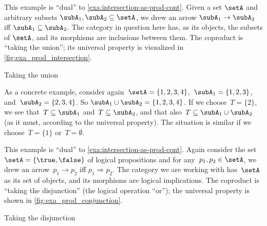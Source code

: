\begin{example}
    \label{exa:union-as-coprod-cont}
    This example is ``dual'' to \cref{exa:intersection-as-prod-cont}.
    Given a set $\setA$ and arbitrary subsets $\subA_1, \subA_2 \subseteq \setA$, we drew an arrow $\subA_1 \to \subA_2$ iff $\subA_1 \subseteq \subA_2$. The category in question here has, as its objects, the subsets of $\setA$, and its morphisms are inclusions between them.
    The coproduct is ``taking the union''; its universal property is visualized in \cref{fig:exa_prod_intersection}.
    \begin{marginfigure}
        \centering
        \caption{Taking the union}
        \label{fig:exa_coprod_union_cont}
    \end{marginfigure}
    As a concrete example, consider again~$\setA = \{ 1, 2, 3, 4 \}$,~$\subA_1 = \{ 1, 2, 3 \}$, and~$\subA_2 = \{2, 3, 4 \}$. So $\subA_1 \cup \subA_2 = \{1,2, 3,4\}$.
    If we choose~$T = \{ 2 \}$, we see that~$T \subseteq \subA_1$ and~$T \subseteq \subA_2$, and that also~$T \subseteq \subA_1 \cup \subA_2$ (as it must, according to the universal property).
    The situation is similar if we choose~$T = \{ 1\}$ or~$T = \emptyset$.
\end{example}


\begin{example}
    \label{exa:disjunction-as-coprod-cont}
    This example is ``dual'' to \cref{exa:intersection-as-prod-cont}.
    Again consider the set~$\setA = \{ \true, \false \}$ of logical propositions and for any~$p_1, p_2  \in \setA$, we drew an arrow~$p_1 \to p_2$ iff $p_1 \Rightarrow p_2$.
    The category we are working with has~$\setA$ as its set of objects, and its morphisms are logical implications.
    The coproduct is ``taking the disjunction'' (the logical operation ``or''); the universal property is shown in \cref{fig:exa_prod_conjunction}.
    \begin{marginfigure}
        \centering
        \caption{Taking the disjunction}
        \label{fig:exa_coprod_disjunction_cont}
    \end{marginfigure}
\end{example}


